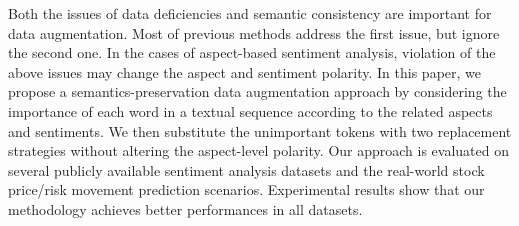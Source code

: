Both the issues of data deficiencies and semantic consistency are important for data augmentation. Most of previous methods address the first issue, but ignore the second one. In the cases of aspect-based sentiment analysis, violation of the above issues may change the aspect and sentiment polarity. In this paper, we propose a semantics-preservation data augmentation approach by considering the importance of each word in a textual sequence according to the related aspects and sentiments. We then substitute the unimportant tokens with two replacement strategies without altering the aspect-level polarity. Our approach is evaluated on several publicly available sentiment analysis datasets and the real-world stock price/risk movement prediction scenarios. Experimental results show that our methodology achieves better performances in all datasets.
